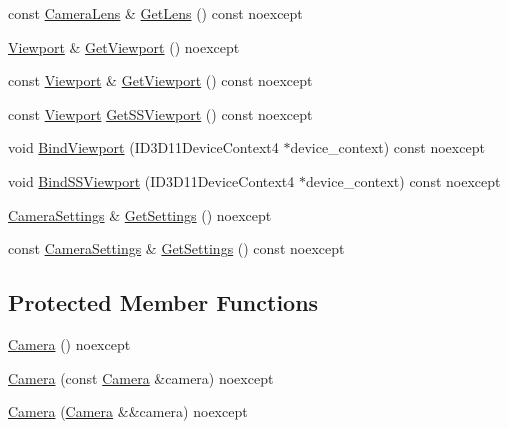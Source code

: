 \begin{DoxyCompactItemize}
\item 
const \hyperlink{classmage_1_1_camera_lens}{Camera\+Lens} \& \hyperlink{classmage_1_1_camera_ac2529ae81deabfbfed8f96cbf5b778eb}{Get\+Lens} () const noexcept
\item 
\hyperlink{classmage_1_1_viewport}{Viewport} \& \hyperlink{classmage_1_1_camera_a73deec0aefd507ec97da36069917f97c}{Get\+Viewport} () noexcept
\item 
const \hyperlink{classmage_1_1_viewport}{Viewport} \& \hyperlink{classmage_1_1_camera_afe08e4f43e57608f8bd45f3fefc89d47}{Get\+Viewport} () const noexcept
\item 
const \hyperlink{classmage_1_1_viewport}{Viewport} \hyperlink{classmage_1_1_camera_aa82c733bd7c71518fa4c0b189f87277f}{Get\+S\+S\+Viewport} () const noexcept
\item 
void \hyperlink{classmage_1_1_camera_a905515a4ffae0bb126aff858ec677231}{Bind\+Viewport} (I\+D3\+D11\+Device\+Context4 $\ast$device\+\_\+context) const noexcept
\item 
void \hyperlink{classmage_1_1_camera_a4e961fccd81e9d6ed160f59e2b8fbc3c}{Bind\+S\+S\+Viewport} (I\+D3\+D11\+Device\+Context4 $\ast$device\+\_\+context) const noexcept
\item 
\hyperlink{classmage_1_1_camera_settings}{Camera\+Settings} \& \hyperlink{classmage_1_1_camera_af4077967b2b676bc66226fd7a5d15220}{Get\+Settings} () noexcept
\item 
const \hyperlink{classmage_1_1_camera_settings}{Camera\+Settings} \& \hyperlink{classmage_1_1_camera_a0174b0d44d749a678acb388b4a60b8c9}{Get\+Settings} () const noexcept
\end{DoxyCompactItemize}
\subsection*{Protected Member Functions}
\begin{DoxyCompactItemize}
\item 
\hyperlink{classmage_1_1_camera_a812001953d821fd23bb9509e5a649508}{Camera} () noexcept
\item 
\hyperlink{classmage_1_1_camera_a13f576c2ea50712145e43501bf3cae9c}{Camera} (const \hyperlink{classmage_1_1_camera}{Camera} \&camera) noexcept
\item 
\hyperlink{classmage_1_1_camera_a858d43c7b166ef580c7d971719045371}{Camera} (\hyperlink{classmage_1_1_camera}{Camera} \&\&camera) noexcept
\end{DoxyCompactItemize}

